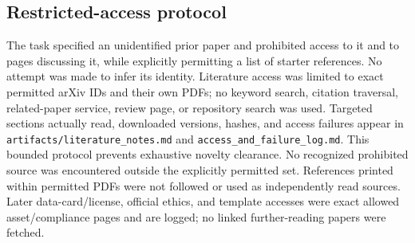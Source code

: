\subsection{Restricted-access protocol}\label{app:access}
The task specified an unidentified prior paper and prohibited access to it and to pages discussing it, while explicitly permitting a list of starter references. No attempt was made to infer its identity. Literature access was limited to exact permitted arXiv IDs and their own PDFs; no keyword search, citation traversal, related-paper service, review page, or repository search was used. Targeted sections actually read, downloaded versions, hashes, and access failures appear in \texttt{artifacts/literature\_notes.md} and \texttt{access\_and\_failure\_log.md}. This bounded protocol prevents exhaustive novelty clearance. No recognized prohibited source was encountered outside the explicitly permitted set. References printed within permitted PDFs were not followed or used as independently read sources. Later data-card/license, official ethics, and template accesses were exact allowed asset/compliance pages and are logged; no linked further-reading papers were fetched.
